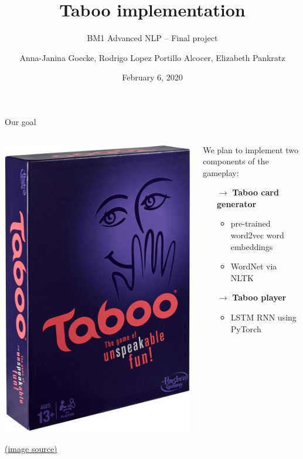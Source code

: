 \documentclass[11pt]{beamer}
\title{Taboo implementation}
\subtitle{BM1 Advanced NLP -- Final project}
\date{February 6, 2020}
\author{Anna-Janina Goecke, \newline Rodrigo Lopez Portillo Alcocer, \newline Elizabeth Pankratz \newline}
\institute{Universität Potsdam}
\begin{document}
	
\maketitle


\begin{frame}{Our goal}

\begin{columns}

\begin{column}{0.5\textwidth}

	\begin{center}
		\includegraphics[width=.6\linewidth]{taboo.jpg}
	\end{center}
		
	\vfill 
	{\tiny \href{https://www.amazon.com/Hasbro-A4626-Taboo-Board-Game/dp/B00D4NJSBW}{(image source)} }

\end{column}

\begin{column}{0.5\textwidth}

	We plan to implement two components of the gameplay:
	
	\begin{itemize}
		\item[$\rightarrow$] \textbf{Taboo card generator}
		\begin{itemize}
			\item pre-trained word2vec word embeddings
			\item WordNet via NLTK
		\end{itemize}
		\item[$\rightarrow$] \textbf{Taboo player}
		\begin{itemize}
			\item LSTM RNN using PyTorch
		\end{itemize}
	\end{itemize}


\end{column}
\end{columns}
\end{frame}
\end{document}
